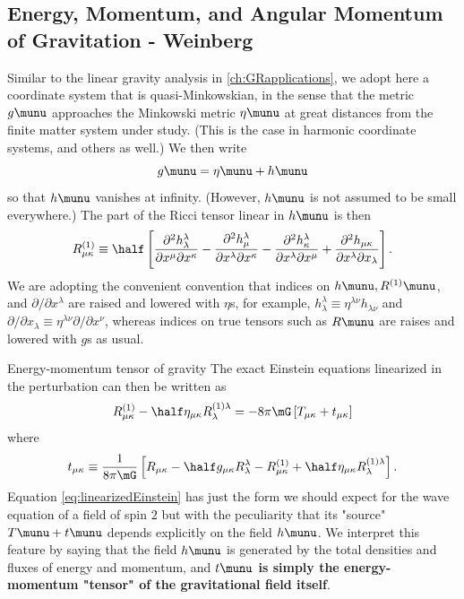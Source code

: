 \subsection{Energy, Momentum, and Angular Momentum of Gravitation - Weinberg}
Similar to the linear gravity analysis in \ref{ch:GRapplications}, we adopt here a coordinate system that is quasi-Minkowskian, in the sense that the metric $g\munu$ approaches the Minkowski metric $\eta\munu$ at great distances from the finite matter system under study. (This is the case in harmonic coordinate systems, and others as well.) We then write
\begin{equation}
	g\munu = \eta\munu + h\munu
\end{equation}
so that $h\munu$ vanishes at infinity. (However, $h\munu$ is not assumed to be small everywhere.)  The part of the Ricci tensor linear in $h\munu$ is then
\begin{equation}
R^{(1)}_{\mu \kappa} \equiv \half \left[\frac{\partial^2 h^\lambda_\lambda}{\partial x^\mu \partial x^\kappa} - \frac{\partial^2 h^\lambda_\mu}{\partial x^\lambda \partial x^\kappa } - \frac{\partial^2 h^\lambda_\kappa }{\partial x^\lambda \partial x^\mu} + \frac{\partial^2 h_{\mu \kappa}}{\partial x^\lambda \partial x_\lambda}\right].
\end{equation}
We are adopting the convenient convention that indices on $h\munu, R^{(1)}\munu$, and $\partial/\partial x^\lambda$ are raised and lowered with $\eta$s, for example, $h^\lambda_\lambda \equiv \eta^{\lambda \nu} h_{\lambda \nu}$ and $\partial/\partial x_\lambda \equiv \eta^{\lambda \nu} \partial/\partial x^\nu$, whereas indices on true tensors such as $R\munu$ are raises and lowered with $g$s as usual. 
\begin{mybox}{Energy-momentum tensor of gravity}
	The exact Einstein equations linearized in the perturbation can then be written as
	\begin{equation}
	\label{eq:linearizedEinstein}
	R^{(1)}_{\mu \kappa} - \half \eta_{\mu \kappa} R^{(1)\lambda}_\lambda = - 8 \pi \mG \left[T_{\mu \kappa} + t_{\mu \kappa} \right]
	\end{equation}
	where
	\begin{equation}
		\label{eq:energymomentumtensorofGravity}
		t_{\mu \kappa} \equiv \frac{1}{8 \pi \mG} \left[R_{\mu \kappa} - \half g_{\mu \kappa} R^\lambda_\lambda - R^{(1)}_{\mu \kappa} + \half \eta_{\mu \kappa} R^{(1)\lambda}_\lambda\right].
	\end{equation}
	Equation \ref{eq:linearizedEinstein} has just the form we should expect for the wave equation of a field of spin $2$  but with the peculiarity that its "source" $T\munu+t\munu$ depends explicitly on the field $h\munu$. We interpret this feature by saying that the field $h\munu$ is generated by the total densities and fluxes of energy and momentum, and 
	\textbf{$t\munu$ is simply the energy-momentum "tensor" of the gravitational field itself}. \\
		\end{mybox}
